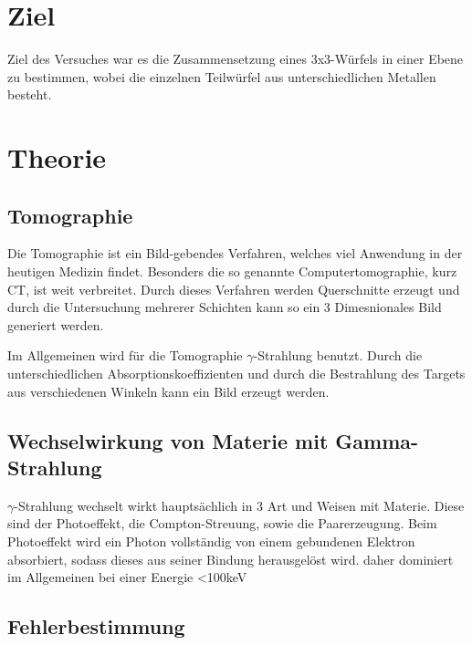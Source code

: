 \section{Ziel}
Ziel des Versuches war es die Zusammensetzung eines 3x3-Würfels in einer Ebene zu bestimmen, wobei die einzelnen Teilwürfel aus unterschiedlichen Metallen besteht. 

\section{Theorie}
\subsection{Tomographie}
Die Tomographie ist ein Bild-gebendes Verfahren, welches viel Anwendung in der heutigen Medizin findet. Besonders die so genannte Computertomographie, kurz CT, ist weit 
verbreitet.
Durch dieses Verfahren werden Querschnitte erzeugt und durch die Untersuchung mehrerer Schichten kann so ein 3 Dimesnionales Bild generiert werden.

\noindent
Im Allgemeinen wird für die Tomographie $\gamma$-Strahlung benutzt. Durch die unterschiedlichen Absorptionskoeffizienten und durch die Bestrahlung des Targets aus 
verschiedenen Winkeln kann ein Bild erzeugt werden.

\subsection{Wechselwirkung von Materie mit Gamma-Strahlung}
$\gamma$-Strahlung wechselt wirkt hauptsächlich in 3 Art und Weisen mit Materie. Diese sind der Photoeffekt, die Compton-Streuung, sowie die Paarerzeugung.
Beim Photoeffekt wird ein Photon vollständig von einem gebundenen Elektron absorbiert, sodass dieses aus seiner Bindung herausgelöst wird. 
daher dominiert im Allgemeinen bei einer Energie <100keV 

\subsection{Fehlerbestimmung}